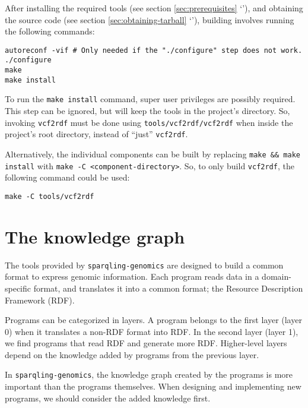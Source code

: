   After installing the required tools (see section \ref{sec:prerequisites}
  {\color{LinkGray}`'}), and obtaining the source
  code (see section \ref{sec:obtaining-tarball} {\color{LinkGray}
    `'}), building involves running the following
  commands:

\begin{siderules}
\begin{verbatim}
autoreconf -vif # Only needed if the "./configure" step does not work.
./configure
make
make install
\end{verbatim}
\end{siderules}

  To run the \texttt{make install} command, super user privileges are possibly
  required.  This step can be ignored, but will keep the tools in the project's
  directory.  So, invoking \texttt{vcf2rdf} must be done using
  \texttt{tools/vcf2rdf/vcf2rdf} when inside the project's root directory,
  instead of ``just'' \texttt{vcf2rdf}.

Alternatively, the individual components can be built by replacing
\texttt{make \&\& make install} with \texttt{make -C <component-directory>}.
So, to only build \texttt{vcf2rdf}, the following command could be used:
\begin{siderules}
\begin{verbatim}
make -C tools/vcf2rdf
\end{verbatim}
\end{siderules}

\chapter{The knowledge graph}

  The tools provided by \texttt{sparqling-genomics} are designed to build a
  common format to express genomic information.  Each program reads data in
  a domain-specific format, and translates it into a common format; the
  Resource Description Framework (RDF).

  Programs can be categorized in layers.  A program belongs to the first
  layer (layer 0) when it translates a non-RDF format into RDF.  In the
  second layer (layer 1), we find programs that read RDF and generate more
  RDF.  Higher-level layers depend on the knowledge added by programs from
  the previous layer.

  In \texttt{sparqling-genomics}, the knowledge graph created by the programs
  is more important than the programs themselves.  When designing and
  implementing new programs, we should consider the added knowledge first.

